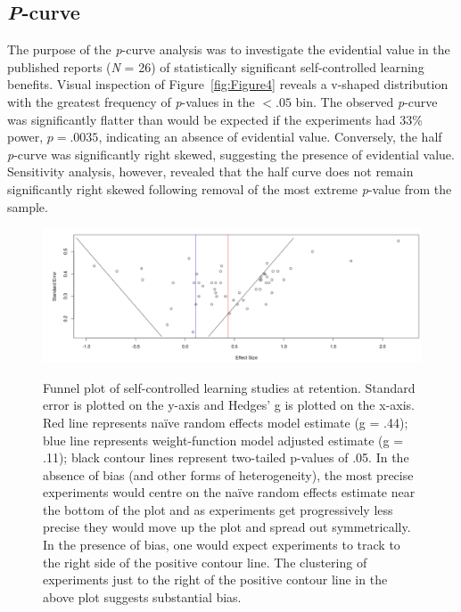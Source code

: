 \documentclass[man,floatsintext,hidelinks]{apa7}
\begin{document}

\subsection{\emph{P}-curve}
The purpose of the \emph{p}-curve analysis was to investigate the evidential value in the published reports (\emph{N} = 26) of statistically significant self-controlled learning benefits. Visual inspection of Figure~\ref{fig:Figure4} reveals a v-shaped distribution with the greatest frequency of \emph{p}-values in the $< .05$ bin. The observed \emph{p}-curve was significantly flatter than would be expected if the experiments had 33\% power, $p = .0035$, indicating an absence of evidential value. Conversely, the half \emph{p}-curve \parencite{Simonsohn2015-mn} was significantly right skewed, suggesting the presence of evidential value. Sensitivity analysis, however, revealed that the half curve does not remain significantly right skewed following removal of the most extreme \emph{p}-value from the sample.

\begin{figure}[h]
	\caption{Funnel plot of self-controlled learning studies at retention. Standard error is plotted on the y-axis and Hedges' g is plotted on the x-axis.  Red line represents naïve random effects model estimate (g = .44); blue line represents weight-function model adjusted estimate (g = .11); black contour lines represent two-tailed p-values of .05. In the absence of bias (and other forms of heterogeneity), the most precise experiments would centre on the naïve random effects estimate near the bottom of the plot and as experiments get progressively less precise they would move up the plot and spread out symmetrically. In the presence of bias, one would expect experiments to track to the right side of the positive contour line. The clustering of experiments just to the right of the positive contour line in the above plot suggests substantial bias.}
	\centering
	\includegraphics[scale=1.75]{figs/fig3.pdf}
    \label{fig:Figure3}
\end{figure}
\end{document}
